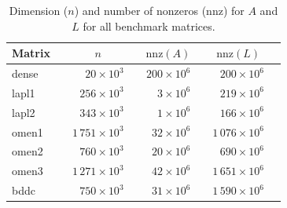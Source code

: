 \begin{table}[t]
  \centering
  \small
  \begin{tabular}{ll|rrrrrr}
  \hline
  Matrix      &&  \multicolumn{1}{c}{${n}$} &&
            \multicolumn{1}{c}{${\text{nnz}(A)}$}  &&
            \multicolumn{1}{c}{${\text{nnz}(L)}$}   \\
  \hline
  dense  && $    20 \times 10^3$ && $200 \times 10^6$ &&  $  200 \times 10^6$  \\ %
  lapl1  && $   256 \times 10^3$ && $  3 \times 10^6$ &&  $  219 \times 10^6$  \\ %
  lapl2  && $   343 \times 10^3$ && $  1 \times 10^6$ &&  $  166 \times 10^6$  \\ %
  omen1  && $1\,751 \times 10^3$ && $ 32 \times 10^6$ && $1\,076 \times 10^6$  \\ %
  omen2  && $   760 \times 10^3$ && $ 20 \times 10^6$ && $   690 \times 10^6$  \\ %
  omen3  && $1\,271 \times 10^3$ && $ 42 \times 10^6$ && $1\,651 \times 10^6$  \\ %
  bddc   && $   750 \times 10^3$ && $ 31 \times 10^6$ && $1\,590 \times 10^6$  \\ %
  \hline
  \end{tabular}
  \caption{Dimension ($n$) and number of nonzeros ($\text{nnz}$) for $A$ and
$L$ for all benchmark matrices.}
  \label{tab:m:list}
\end{table}


